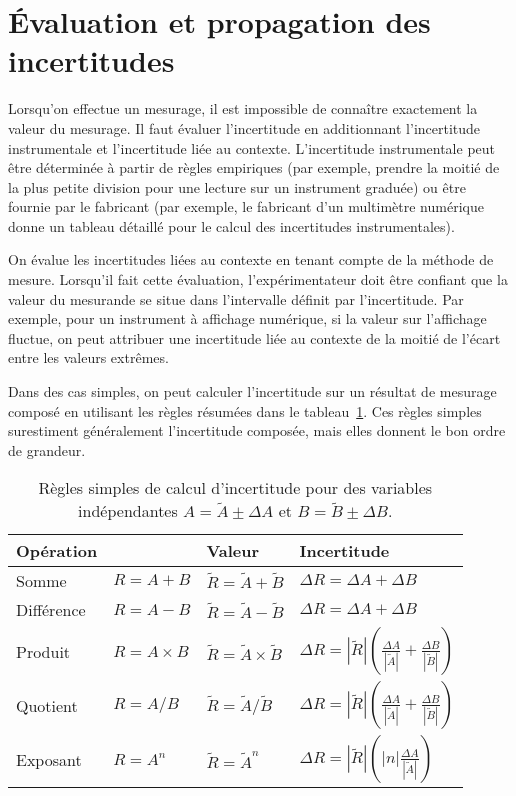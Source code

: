 \documentclass[nofonts]{tufte-handout}
\begin{document}
\section{Évaluation et propagation des incertitudes}

Lorsqu'on effectue un mesurage, il est impossible de connaître exactement la
valeur du mesurage. Il faut évaluer l'incertitude en additionnant
l'incertitude instrumentale et l'incertitude liée au contexte.
L'incertitude instrumentale peut être déterminée à partir de règles empiriques
(par exemple, prendre la moitié de la plus petite division pour une lecture sur
un instrument graduée) ou être fournie par le fabricant (par exemple, le
fabricant d'un multimètre numérique donne un tableau détaillé pour le calcul des
incertitudes instrumentales).

On évalue les incertitudes liées au contexte en tenant compte de la méthode de
mesure. Lorsqu'il fait cette évaluation, l'expérimentateur doit être confiant
que la valeur du mesurande se situe dans l'intervalle définit par l'incertitude.
Par exemple, pour un instrument à affichage numérique, si la valeur sur
l'affichage fluctue, on peut attribuer une incertitude liée au contexte de la
moitié de l'écart entre les valeurs extrêmes.

Dans des cas simples, on peut calculer l'incertitude sur un résultat de mesurage
composé en utilisant les règles résumées dans le
tableau~\ref{tab:regles_simples}. Ces règles simples surestiment généralement
l'incertitude composée, mais elles donnent le bon ordre de grandeur.

\begin{table}
  \renewcommand{\arraystretch}{1.4}
  \begin{tabular}{llll}
    \toprule
    Opération   & &  Valeur &  Incertitude  \\
    \midrule
    Somme  &  $R = A + B$
      &  $\tilde{R} = \tilde{A} + \tilde{B}$
      & $\Delta R = \Delta A + \Delta B$ \\
    Différence  &  $R = A - B$
      &  $\tilde{R} = \tilde{A} - \tilde{B}$
      & $\Delta R = \Delta A + \Delta B$ \\
    Produit  &   $R = A \times B$
      &  $\tilde{R} = \tilde{A} \times \tilde{B}$
      & $\Delta R = \left|\tilde{R}\right| \left(
          \frac{\Delta A}{\left|\tilde{A}\right|} + \frac{\Delta B}{\left|\tilde{B}\right|}
        \right)$ \\
    Quotient  &  $R = A / B$
      &  $\tilde{R} = \tilde{A} / \tilde{B}$
      & $\Delta R = \left|\tilde{R}\right| \left(
          \frac{\Delta A}{\left|\tilde{A}\right|} + \frac{\Delta B}{\left|\tilde{B}\right|}
        \right)$ \\
    Exposant  &  $R = A^n$
      &  $\tilde{R} = \tilde{A}^n$
      & $\Delta R = \left|\tilde{R}\right| \left(\left|n\right|\frac{\Delta A}{\left|\tilde{A}\right|}\right)$ \\
      \bottomrule
  \end{tabular}
  \caption{Règles simples de calcul d'incertitude pour des variables
  indépendantes $A = \tilde{A} \pm \Delta A$ et $B = \tilde{B} \pm \Delta B$.}
  \label{tab:regles_simples}
\end{table}
\end{document}
